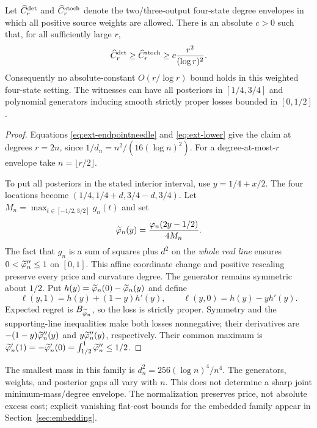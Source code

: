 \begin{theorem}
\label{thm:ext-weightdegenerate}
Let $\widehat C_r^{\mathrm{det}}$ and $\widehat C_r^{\mathrm{stoch}}$ denote the two/three-output
four-state degree envelopes in which all positive source weights are allowed.
There is an absolute $c>0$ such that, for all sufficiently large $r$,
\[
 \widehat C_r^{\mathrm{det}}\ge\widehat C_r^{\mathrm{stoch}}
 \ge c\frac{r^2}{(\log r)^2}.
\]
Consequently no absolute-constant $O(r/\log r)$ bound holds in this weighted
four-state setting. The witnesses can have all posteriors in $[1/4,3/4]$
and polynomial generators inducing smooth strictly proper losses bounded
in $[0,1/2]$.
\end{theorem}
\begin{proof}
Equations \eqref{eq:ext-endpointneedle} and \eqref{eq:ext-lower} give the
claim at degrees $r=2n$, since $1/d_n=n^2/(16(\log n)^2)$.
For a degree-at-most-$r$ envelope take $n=\lfloor r/2\rfloor$.

To put all posteriors in the stated interior interval, use
$y=1/4+x/2$. The four locations become
$(1/4,1/4+d,3/4-d,3/4)$.
Let $M_n=\max_{t\in[-1/2,3/2]}g_n(t)$ and set
\[
 \widetilde{\varphi}_n(y)=\frac{\varphi_n(2y-1/2)}{4M_n}.
\]
The fact that $g_n$ is a sum of squares plus $d^2$ on the \emph{whole real
line} ensures $0<\widetilde{\varphi}_n''\le1$ on $[0,1]$. This affine coordinate
change and positive rescaling preserve every price and curvature degree.
The generator remains symmetric about $1/2$. Put
$h(y)=\widetilde{\varphi}_n(0)-\widetilde{\varphi}_n(y)$ and define
\[
 \ell(y,1)=h(y)+(1-y)h'(y),\qquad
 \ell(y,0)=h(y)-yh'(y).
\]
Expected regret is $B_{\widetilde{\varphi}_n}$, so the loss is strictly proper.
Symmetry and the supporting-line inequalities make both losses nonnegative;
their derivatives are $-(1-y)\widetilde{\varphi}_n''(y)$ and
$y\widetilde{\varphi}_n''(y)$, respectively. Their common maximum is
$\widetilde{\varphi}_n'(1)=-\widetilde{\varphi}_n'(0)
=\int_{1/2}^1\widetilde{\varphi}_n''\le1/2$.
\end{proof}


The smallest mass in this family is $d_n^2=256(\log n)^4/n^4$.
The generators, weights, and posterior gaps all vary with $n$. This does
not determine a sharp joint minimum-mass/degree envelope. The normalization
preserves price, not absolute excess cost; explicit vanishing flat-cost
bounds for the embedded family appear in Section~\ref{sec:embedding}.
